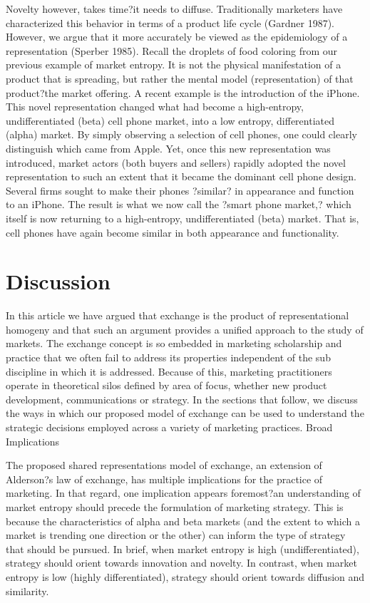 Novelty however, takes time?it needs to diffuse. Traditionally marketers have characterized this behavior in terms of a product life cycle (Gardner 1987). However, we argue that it more accurately be viewed as the epidemiology of a representation (Sperber 1985). Recall the droplets of food coloring from our previous example of market entropy. It is not the physical manifestation of a product that is spreading, but rather the mental model (representation) of that product?the market offering. 
A recent example is the introduction of the iPhone. This novel representation changed what had become a high-entropy, undifferentiated (beta) cell phone market, into a low entropy, differentiated (alpha) market. By simply observing a selection of cell phones, one could clearly distinguish which came from Apple. Yet, once this new representation was introduced, market actors (both buyers and sellers) rapidly adopted the novel representation to such an extent that it became the dominant cell phone design. Several firms sought to make their phones ?similar? in appearance and function to an iPhone. The result is what we now call the ?smart phone market,? which itself is now returning to a high-entropy, undifferentiated (beta) market. That is, cell phones have again become similar in both appearance and functionality.


\section{Discussion}
In this article we have argued that exchange is the product of representational homogeny and that such an argument provides a unified approach to the study of markets. The exchange concept is so embedded in marketing scholarship and practice that we often fail to address its properties independent of the sub discipline in which it is addressed. Because of this, marketing practitioners operate in theoretical silos defined by area of focus, whether new product development, communications or strategy. In the sections that follow, we discuss the ways in which our proposed model of exchange can be used to understand the strategic decisions employed across a variety of marketing practices.
Broad Implications

The proposed shared representations model of exchange, an extension of Alderson?s law of exchange, has multiple implications for the practice of marketing. In that regard, one implication appears foremost?an understanding of market entropy should precede the formulation of marketing strategy. This is because the characteristics of alpha and beta markets (and the extent to which a market is trending one direction or the other) can inform the type of strategy that should be pursued. In brief, when market entropy is high (undifferentiated), strategy should orient towards innovation and novelty. In contrast, when market entropy is low (highly differentiated), strategy should orient towards diffusion and similarity.  

